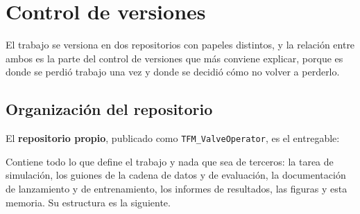 \chapter{Control de versiones}
\label{Control de versiones}

El trabajo se versiona en dos repositorios con papeles distintos, y la relación entre ambos es la
parte del control de versiones que más conviene explicar, porque es donde se perdió trabajo una
vez y donde se decidió cómo no volver a perderlo.

\section{Organización del repositorio}

El \textbf{repositorio propio}, publicado como \texttt{TFM\_ValveOperator}, es el entregable:

\begin{center}
\repolink
\end{center} Contiene todo lo que
define el trabajo y nada que sea de terceros: la tarea de simulación, los guiones de la cadena de
datos y de evaluación, la documentación de lanzamiento y de entrenamiento, los informes de
resultados, las figuras y esta memoria. Su estructura es la siguiente.

